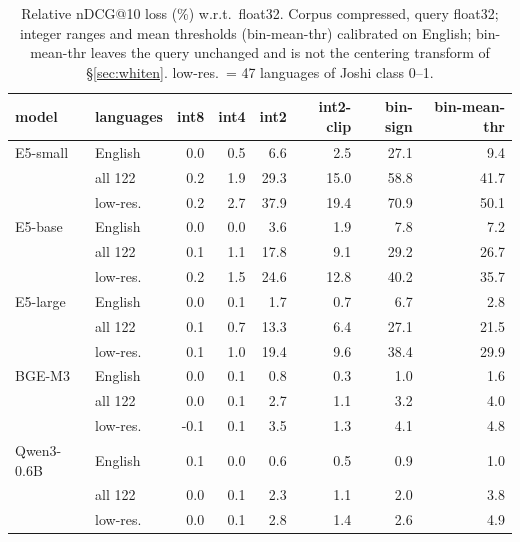 \begin{table}[t]\centering\footnotesize
\begin{tabular}{llrrrrrr}
\toprule
model & languages & int8 & int4 & int2 & int2-clip & bin-sign & bin-mean-thr \\
\midrule
E5-small & English & 0.0 & 0.5 & 6.6 & 2.5 & 27.1 & 9.4 \\
 & all 122 & 0.2 & 1.9 & 29.3 & 15.0 & 58.8 & 41.7 \\
 & low-res. & 0.2 & 2.7 & 37.9 & 19.4 & 70.9 & 50.1 \\
E5-base & English & 0.0 & 0.0 & 3.6 & 1.9 & 7.8 & 7.2 \\
 & all 122 & 0.1 & 1.1 & 17.8 & 9.1 & 29.2 & 26.7 \\
 & low-res. & 0.2 & 1.5 & 24.6 & 12.8 & 40.2 & 35.7 \\
E5-large & English & 0.0 & 0.1 & 1.7 & 0.7 & 6.7 & 2.8 \\
 & all 122 & 0.1 & 0.7 & 13.3 & 6.4 & 27.1 & 21.5 \\
 & low-res. & 0.1 & 1.0 & 19.4 & 9.6 & 38.4 & 29.9 \\
BGE-M3 & English & 0.0 & 0.1 & 0.8 & 0.3 & 1.0 & 1.6 \\
 & all 122 & 0.0 & 0.1 & 2.7 & 1.1 & 3.2 & 4.0 \\
 & low-res. & -0.1 & 0.1 & 3.5 & 1.3 & 4.1 & 4.8 \\
Qwen3-0.6B & English & 0.1 & 0.0 & 0.6 & 0.5 & 0.9 & 1.0 \\
 & all 122 & 0.0 & 0.1 & 2.3 & 1.1 & 2.0 & 3.8 \\
 & low-res. & 0.0 & 0.1 & 2.8 & 1.4 & 2.6 & 4.9 \\
\bottomrule
\end{tabular}
\caption{Relative nDCG@10 loss (\%) w.r.t.\ float32. Corpus compressed, query float32; integer ranges and mean thresholds (bin-mean-thr) calibrated on English; bin-mean-thr leaves the query unchanged and is not the centering transform of \S\ref{sec:whiten}. low-res.\ = 47 languages of Joshi class 0--1.}\label{tab:drop}
\end{table}